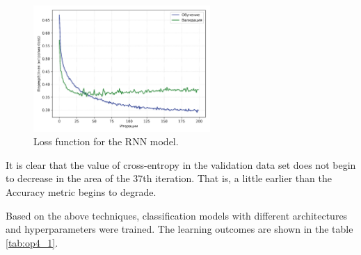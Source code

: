 \documentclass[12pt]{report}
\theoremstyle{definition}
\begin{document}
\begin{figure}[ht]
	\centering
	\includegraphics[width=0.6\textwidth]{op4_5}
	\caption{Loss function for the RNN model.}
	\label{fig:op4_5}
\end{figure}

It is clear that the value of cross-entropy in the validation data set does not begin to decrease in the area of the 37th iteration.
That is, a little earlier than the Accuracy metric begins to degrade.
 
Based on the above techniques, classification models with different architectures and hyperparameters were trained.
The learning outcomes are shown in the table \ref{tab:op4_1}.

\begin{table}[H]
	\centering
	\caption{The learning outcomes.}
	\label{tab:op4_1}
\end{table}
\end{document}
